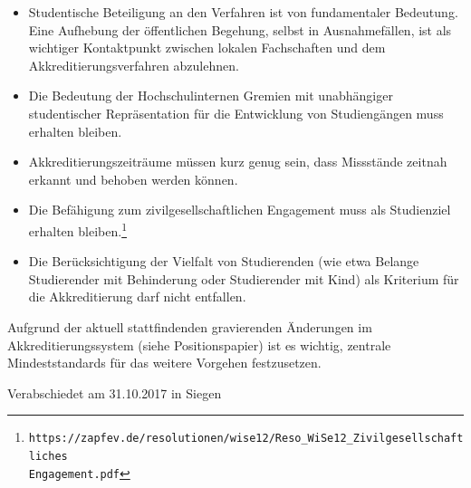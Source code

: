 \documentclass[DIV=calc]{scrartcl}
\begin{document}
\begin{itemize}
\item Studentische Beteiligung an den Verfahren ist von fundamentaler Bedeutung. Eine Aufhebung der öffentlichen Begehung, selbst in Ausnahmefällen, ist als wichtiger Kontaktpunkt zwischen lokalen Fachschaften und dem Akkreditierungsverfahren abzulehnen.
\item Die Bedeutung der Hochschulinternen Gremien mit unabhängiger studentischer Repräsentation für die Entwicklung von Studiengängen muss erhalten bleiben.
\item Akkreditierungszeiträume müssen kurz genug sein, dass Missstände zeitnah erkannt und behoben werden können.
\item Die Befähigung zum zivilgesellschaftlichen Engagement muss als Studienziel erhalten bleiben.\footnote{\texttt{https://zapfev.de/resolutionen/wise12/Reso\_WiSe12\_Zivilgesellschaftliches \\ Engagement.pdf}}
\item Die Berücksichtigung der Vielfalt von Studierenden (wie etwa Belange Studierender mit Behinderung oder Studierender mit Kind) als Kriterium für die Akkreditierung darf nicht entfallen.
\end{itemize}
Aufgrund der aktuell stattfindenden gravierenden Änderungen im Akkreditierungssystem (siehe Positionspapier) ist es wichtig, zentrale Mindeststandards für das weitere Vorgehen festzusetzen. 
\vspace{-0.5\baselineskip}
    \begin{flushright}
        Verabschiedet am 31.10.2017 in Siegen
    \end{flushright}
\end{document}

